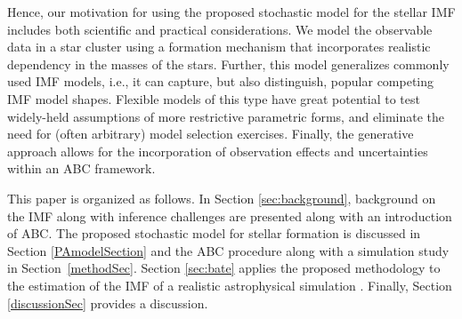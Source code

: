 \documentclass[ejs]{imsart}
\numberwithin{equation}{section}
\theoremstyle{plain}
\begin{document}
%



Hence, our motivation for using the proposed stochastic model for the stellar IMF includes both scientific and practical considerations. We model the observable data in a star cluster using a formation mechanism that incorporates realistic dependency in the masses of the stars. Further, this model generalizes commonly used IMF models, i.e., it can capture, but also distinguish, popular competing IMF model shapes. Flexible models of this type have great potential to test widely-held assumptions of more restrictive parametric forms, and eliminate the need for (often arbitrary) model selection exercises. Finally, the generative approach allows for the incorporation of observation effects and uncertainties within an ABC framework.


This paper is organized as follows. In Section \ref{sec:background}, background on the IMF along with inference challenges are presented along with an introduction of ABC. The proposed stochastic model for stellar formation is discussed in Section \ref{PAmodelSection} and the ABC procedure along with a simulation study in Section~\ref{methodSec}. 
Section \ref{sec:bate} applies the proposed methodology to the estimation of the IMF of a realistic astrophysical simulation  \citep{Bate2012}.
Finally, Section \ref{discussionSec} provides a discussion.



\end{document}
